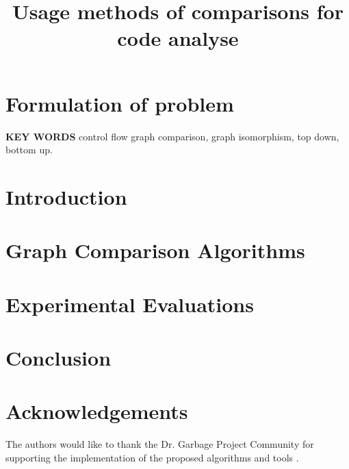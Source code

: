 \documentclass[twocolumn,letterpaper,10pt]{article}
\begin{document}
\date{}

\title{Usage methods of comparisons for code analyse }

%



\maketitle
\thispagestyle{empty}

\section{Formulation of problem}


\noindent
   
   
\noindent
{\bf\normalsize KEY WORDS}\newline
{control flow graph comparison, graph isomorphism, top down, bottom up.}

\section{Introduction}



%

\section{Graph Comparison Algorithms}


\section{\label{experimental_results}Experimental Evaluations}


\section{Conclusion} 


\section{Acknowledgements} 
The authors would like to thank the Dr. Garbage Project Community for supporting the implementation of the proposed algorithms and tools \cite{drgarbage_project}.


\end{document}
